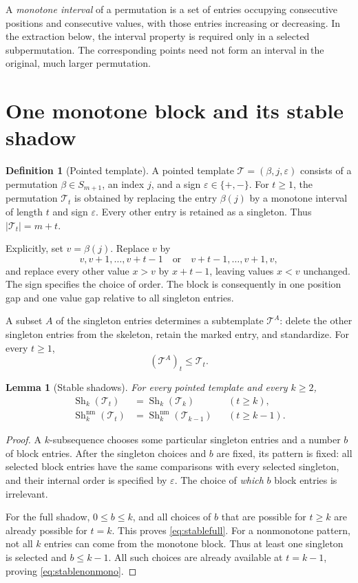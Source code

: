 \documentclass[11pt,a4paper]{article}
\newtheorem{lemma}[theorem]{Lemma}
\theoremstyle{definition}
\newtheorem{definition}[theorem]{Definition}
\theoremstyle{remark}
\DeclareMathOperator{\Sh}{Sh}
\newcommand{\Tm}{\mathcal T}
\newcommand{\shn}[1]{\Sh_k^{\mathrm{nm}}(#1)}
\begin{document}
A \emph{monotone interval} of a permutation is a set of entries occupying
consecutive positions and consecutive values, with those entries increasing
or decreasing. In the extraction below, the interval property is required
only in a selected subpermutation. The corresponding points need not form
an interval in the original, much larger permutation.

\section{One monotone block and its stable shadow}
\label{sec:templates}

\begin{definition}[Pointed template]
A pointed template $\Tm=(\beta,j,\varepsilon)$ consists of a permutation
$\beta\in S_{m+1}$, an index $j$, and a sign $\varepsilon\in\{+,-\}$. For
$t\ge1$, the permutation $\Tm_t$ is obtained by replacing the entry
$\beta(j)$ by a monotone interval of length $t$ and sign $\varepsilon$.
Every other entry is retained as a singleton. Thus $|\Tm_t|=m+t$.
\end{definition}

Explicitly, set $v=\beta(j)$. Replace $v$ by
\[
 v,v+1,\ldots,v+t-1\quad\text{or}\quad v+t-1,\ldots,v+1,v,
\]
and replace every other value $x>v$ by $x+t-1$, leaving values $x<v$
unchanged. The sign specifies the choice of order. The block is consequently
in one position gap and one value gap relative to all singleton entries.

A subset $A$ of the singleton entries determines a subtemplate $\Tm^A$:
delete the other singleton entries from the skeleton, retain the marked
entry, and standardize. For every $t\ge1$,
\begin{equation}\label{eq:subtemplate}
 (\Tm^A)_t\le\Tm_t.
\end{equation}

\begin{lemma}[Stable shadows]\label{lem:stable}
For every pointed template and every $k\ge2$,
\begin{align}
 \Sh_k(\Tm_t)&=\Sh_k(\Tm_k) &&(t\ge k),\label{eq:stablefull}\\
 \shn{\Tm_t}&=\shn{\Tm_{k-1}} &&(t\ge k-1).\label{eq:stablenonmono}
\end{align}
\end{lemma}
\begin{proof}
A $k$-subsequence chooses some particular singleton entries and a number
$b$ of block entries. After the singleton choices and $b$ are fixed, its
pattern is fixed: all selected block entries have the same comparisons
with every selected singleton, and their internal order is specified by
$\varepsilon$. The choice of \emph{which} $b$ block entries is irrelevant.

For the full shadow, $0\le b\le k$, and all choices of $b$ that are possible
for $t\ge k$ are already possible for $t=k$. This proves
\eqref{eq:stablefull}. For a nonmonotone pattern, not all $k$ entries can
come from the monotone block. Thus at least one singleton is selected and
$b\le k-1$. All such choices are already available at $t=k-1$, proving
\eqref{eq:stablenonmono}.
\end{proof}
\end{document}
